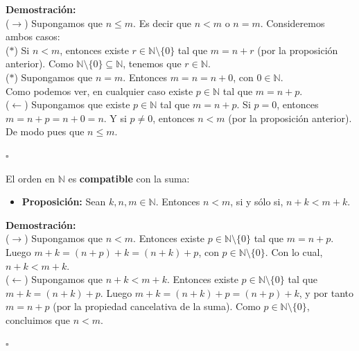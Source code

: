 \documentclass[10 pt]{article}
\begin{document}
\Large{\textbf{Demostración:} \\

($\rightarrow$) Supongamos que $n \leq m$. Es decir que $n<m$ o $n=m$. Consideremos ambos casos: \\

($\ast$) Si $n<m$, entonces existe $r \in \mathbb N \setminus \{0\}$ tal que $m=n+r$ (por la proposición anterior). Como $\mathbb N \setminus \{0\} \subseteq \mathbb N$, tenemos que $r \in \mathbb N$. \\

($\ast$) Supongamos que $n=m$. Entonces $m=n=n+0$, con $0 \in \mathbb N$. \\

Como podemos ver, en cualquier caso existe $p \in \mathbb N$ tal que $m=n+p$. \\

($\leftarrow$) Supongamos que existe $p \in \mathbb N$ tal que $m=n+p$. Si $p=0$, entonces $m=n+p=n+0=n$. Y si $p \neq 0$, entonces $n<m$ (por la proposición anterior). De modo pues que $n \leq m$.} \\

\begin{flushright}
    $\square$
\end{flushright}

\Large{El orden en $\mathbb N$ es \textbf{compatible} con la suma:} \\

\begin{itemize}
    \item \Large{\textbf{Proposición:} Sean $k,n,m \in \mathbb N$. Entonces $n<m$, si y sólo si, $n+k<m+k$.} \\
\end{itemize}

\Large{\textbf{Demostración:} \\

($\rightarrow$) Supongamos que $n<m$. Entonces existe $p \in \mathbb N \setminus \{0\}$ tal que $m=n+p$. Luego $m+k=(n+p)+k=(n+k)+p$, con $p \in \mathbb N \setminus \{0\}$. Con lo cual, $n+k<m+k$. \\

($\leftarrow$) Supongamos que $n+k<m+k$. Entonces existe $p \in \mathbb N \setminus \{0\}$ tal que $m+k=(n+k)+p$. Luego $m+k=(n+k)+p=(n+p)+k$, y por tanto $m=n+p$ (por la propiedad cancelativa de la suma). Como $p \in \mathbb N \setminus \{0\}$, concluimos que $n<m$.} \\

\begin{flushright}
    $\square$
\end{flushright}
\end{document}
